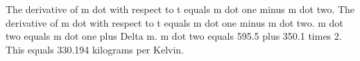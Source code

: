 The derivative of m dot with respect to t equals m dot one minus m dot two.
The derivative of m dot with respect to t equals m dot one minus m dot two.
m dot two equals m dot one plus Delta m.
m dot two equals 595.5 plus 350.1 times 2.
This equals 330.194 kilograms per Kelvin.